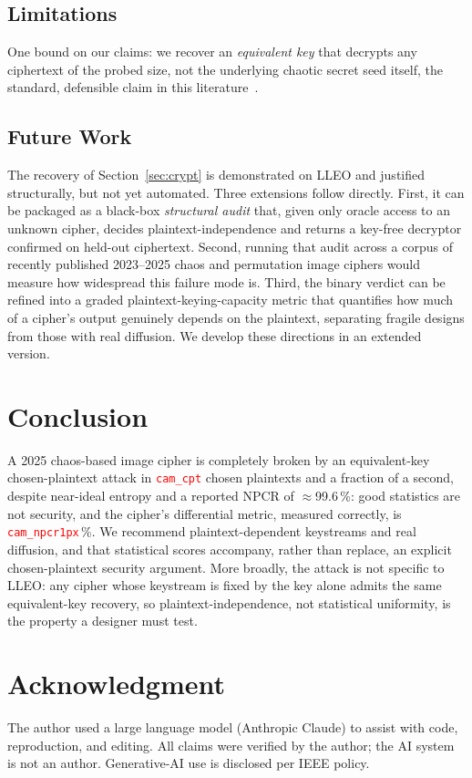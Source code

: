 \documentclass[conference,a4paper]{IEEEtran}
\newcommand{\PH}[1]{\textcolor{red}{\texttt{#1}}}
\begin{document}
\subsection{Limitations}
One bound on our claims: we recover an \emph{equivalent key} that decrypts any ciphertext of the probed
size, not the underlying chaotic secret seed itself, the standard, defensible claim in this
literature~\cite{li2019attacker}.

\subsection{Future Work}
The recovery of Section~\ref{sec:crypt} is demonstrated on LLEO and justified structurally, but not yet
automated. Three extensions follow directly. First, it can be packaged as a black-box \emph{structural
audit} that, given only oracle access to an unknown cipher, decides plaintext-independence and returns a
key-free decryptor confirmed on held-out ciphertext. Second, running that audit across a corpus of
recently published 2023--2025 chaos and permutation image ciphers would measure how widespread this
failure mode is. Third, the binary verdict can be refined into a graded plaintext-keying-capacity metric
that quantifies how much of a cipher's output genuinely depends on the plaintext, separating fragile
designs from those with real diffusion. We develop these directions in an extended version.

\section{Conclusion}
A 2025 chaos-based image cipher is completely broken by an equivalent-key chosen-plaintext attack in
\PH{cam_cpt} chosen plaintexts and a fraction of a second, despite near-ideal entropy and a reported
NPCR of $\approx$99.6\,\%: good statistics are not security, and the cipher's differential metric,
measured correctly, is \PH{cam_npcr1px}\,\%. We recommend plaintext-dependent keystreams and
real diffusion, and that statistical scores accompany, rather than replace, an explicit
chosen-plaintext security argument. More broadly, the attack is not specific to LLEO:
any cipher whose keystream is fixed by the key alone admits the same equivalent-key recovery, so
plaintext-independence, not statistical uniformity, is the property a designer must test.

\section*{Acknowledgment}
The author used a large language model (Anthropic Claude) to assist with code, reproduction, and
editing. All claims were verified by the author; the AI system is not an author. Generative-AI use is
disclosed per IEEE policy.

\linespread{1}\selectfont


\end{document}
